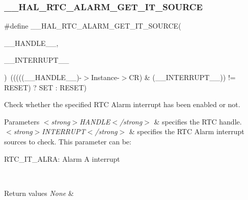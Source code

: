 \subsubsection{\texorpdfstring{\+\_\+\+\_\+\+H\+A\+L\+\_\+\+R\+T\+C\+\_\+\+A\+L\+A\+R\+M\+\_\+\+G\+E\+T\+\_\+\+I\+T\+\_\+\+S\+O\+U\+R\+CE}{\_\_HAL\_RTC\_ALARM\_GET\_IT\_SOURCE}}
{\footnotesize\ttfamily \#define \+\_\+\+\_\+\+H\+A\+L\+\_\+\+R\+T\+C\+\_\+\+A\+L\+A\+R\+M\+\_\+\+G\+E\+T\+\_\+\+I\+T\+\_\+\+S\+O\+U\+R\+CE(\begin{DoxyParamCaption}\item[{}]{\+\_\+\+\_\+\+H\+A\+N\+D\+L\+E\+\_\+\+\_\+,  }\item[{}]{\+\_\+\+\_\+\+I\+N\+T\+E\+R\+R\+U\+P\+T\+\_\+\+\_\+ }\end{DoxyParamCaption})~(((((\+\_\+\+\_\+\+H\+A\+N\+D\+L\+E\+\_\+\+\_\+)-\/$>$Instance-\/$>$CR) \& (\+\_\+\+\_\+\+I\+N\+T\+E\+R\+R\+U\+P\+T\+\_\+\+\_\+)) != R\+E\+S\+ET) ? S\+ET \+: R\+E\+S\+ET)}



Check whether the specified R\+TC Alarm interrupt has been enabled or not. 


\begin{DoxyParams}{Parameters}
{\em $<$strong$>$\+H\+A\+N\+D\+L\+E$<$/strong$>$} & specifies the R\+TC handle. \\
\hline
{\em $<$strong$>$\+I\+N\+T\+E\+R\+R\+U\+P\+T$<$/strong$>$} & specifies the R\+TC Alarm interrupt sources to check. This parameter can be\+: \begin{DoxyItemize}
\item R\+T\+C\+\_\+\+I\+T\+\_\+\+A\+L\+RA\+: Alarm A interrupt \end{DoxyItemize}
\\
\hline
\end{DoxyParams}

\begin{DoxyRetVals}{Return values}
{\em None} & \\
\hline
\end{DoxyRetVals}
\mbox{\label{group___r_t_c___exported___macros_ga8679ec8def03e05fa39474d83b156699}} 
